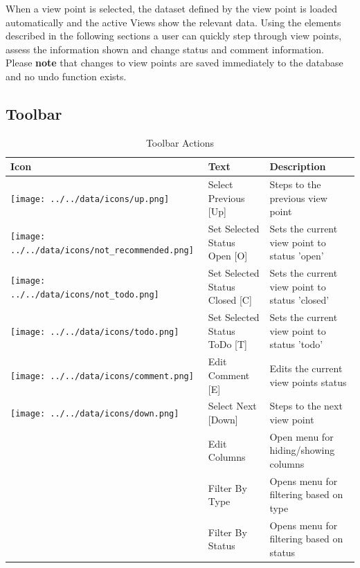 When a view point is selected, the dataset defined by the view point is loaded automatically and the active Views show the relevant data. Using the elements described in the following sections a user can quickly step through view points, assess the information shown and change status and comment information. \\

Please \textbf{note} that changes to view points are saved immediately to the database and no undo function exists.

\subsection{Toolbar}

\begin{table}[H]
  \center
  \begin{tabular}{ | l | l | l |}
    \hline
    \textbf{Icon} & \textbf{Text} &  \textbf{Description} \\ \hline
    \texttt{[image: ../../data/icons/up.png]} & Select Previous [Up] & Steps to the previous view point \\ \hline
    \texttt{[image: ../../data/icons/not\_recommended.png]} & Set Selected Status Open [O] & Sets the current view point to status 'open' \\ \hline
    \texttt{[image: ../../data/icons/not\_todo.png]} & Set Selected Status Closed [C] & Sets the current view point to status 'closed' \\ \hline
    \texttt{[image: ../../data/icons/todo.png]} & Set Selected Status ToDo [T] & Sets the current view point to status 'todo' \\ \hline
    \texttt{[image: ../../data/icons/comment.png]} & Edit Comment [E] & Edits the current view points status \\ \hline
    \texttt{[image: ../../data/icons/down.png]} & Select Next [Down] & Steps to the next view point \\ \hline
    & Edit Columns & Open menu for hiding/showing columns \\ \hline
    & Filter By Type & Opens menu for filtering based on type \\ \hline
    & Filter By Status & Opens menu for filtering based on status \\ \hline
  \end{tabular}
  \caption{Toolbar Actions}
\end{table}
\ \\

